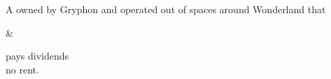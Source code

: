 \parbox{0.72\textwidth}{
A  owned by Gryphon and operated out of spaces around Wonderland that 
} & 
\parbox{0.2\textwidth}{\textcolor{soln-black}{
pays dividends\\

no rent.
}} \\
